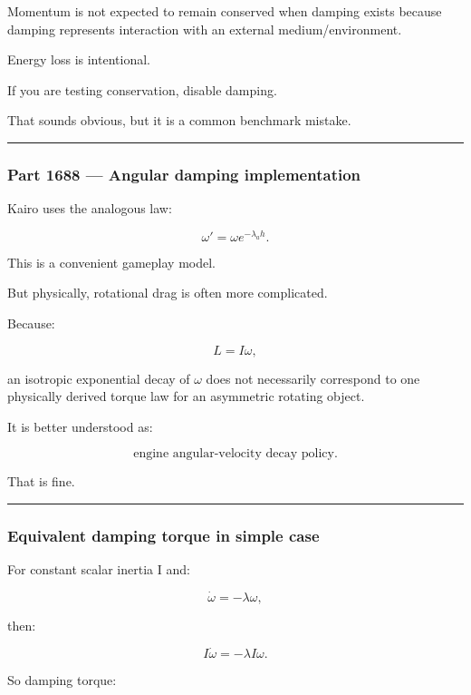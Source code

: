 Momentum is not expected to remain conserved when damping exists because damping represents interaction with an external medium/environment.

Energy loss is intentional.

If you are testing conservation, disable damping.

That sounds obvious, but it is a common benchmark mistake.

\begin{center}\rule{0.5\linewidth}{0.5pt}\end{center}

\subsubsection{Part 1688 --- Angular damping implementation}\label{part-1688-angular-damping-implementation}

Kairo uses the analogous law:

\[
\boxed{
\omega'
=
\omega e^{-\lambda_ah}.
}
\]

This is a convenient gameplay model.

But physically, rotational drag is often more complicated.

Because:

\[
L=I\omega,
\]

an isotropic exponential decay of \(\omega\) does not necessarily correspond to one physically derived torque law for an asymmetric rotating object.

It is better understood as:

\[
\boxed{
\text{engine angular-velocity decay policy}.
}
\]

That is fine.

\begin{center}\rule{0.5\linewidth}{0.5pt}\end{center}

\subsubsection{Equivalent damping torque in simple case}\label{equivalent-damping-torque-in-simple-case}

For constant scalar inertia I and:

\[
\dot\omega=-\lambda\omega,
\]

then:

\[
I\dot\omega
=
-\lambda I\omega.
\]

So damping torque:

